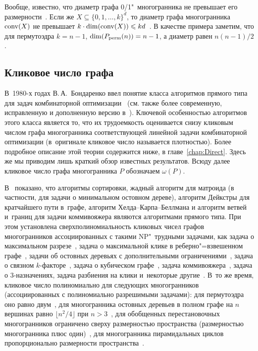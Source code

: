 Вообще, известно, что диаметр графа 0/1"~многогранника не превышает его размерности~\cite{Naddef:1989}.
Если же $X \subseteq \{0,1,\dots,k\}^d$, то диаметр графа многогранника $\operatorname{conv}(X)$ не превышает $k\cdot \dim(\operatorname{conv}(X)) \leqslant k d$~\cite{KleinschmidtOnn:1992}.
В качестве примера заметим, что для пермутоэдра $k=n-1$, $\dim(P_{\textup{perm}}(n)) = n-1$, а диаметр равен $n(n-1)/2$.


\subsection{Кликовое число графа}
\label{sec:CliqueNumber}

В~1980-х годах В.\,А.~Бондаренко ввел понятие класса алгоритмов прямого типа для задач комбинаторной оптимизации~\cite{BondBook:1995} (см. также более современную, исправленную и дополненную версию в~\cite{BondBook:2008}). 
Ключевой особенностью алгоритмов этого класса является то, 
что их трудоемкость оценивается снизу кликовым числом графа многогранника соответствующей линейной задачи комбинаторной оптимизации (в~оригинале %
кликовое число называется плотностью).
Более подробное описание этой теории содержится ниже, в главе~\ref{chap:Direct}.
Здесь же мы приводим лишь краткий обзор известных результатов.
Всюду далее кликовое число графа многогранника $P$ обозначаем $\omega(P)$.

В~\cite{BondBook:1995} показано, что алгоритмы сортировки, 
жадный алгоритм для матроида (в частности, для задачи о минимальном остовном дереве), 
алгоритм Дейкстры для кратчайшего пути в~графе,
алгоритм Хелда--Карпа--Беллмана и алгоритм ветвей и~границ для задачи коммивояжера
являются алгоритмами прямого типа.
При этом установлена сверхполиномиальность кликовых чисел графов многогранников ассоциированных с такими NP"~трудными задачами, как задача
о максимальном разрезе~\cite{Beloshevskii:1986,Barahona:1986},
задача о максимальной клике в реберно"=взвешенном графе~\cite{Greshnev:1984,Bondarenko:1985}, 
задачи об остовных деревьях с дополнительными ограничениями~\cite{Shovgenov:2015}, 
задача о связном $k$-факторе~\cite{Simanchev:2018},
задача о кубическом графе~\cite{Bondarenko:1996},
задача коммивояжера~\cite{Bondarenko:1983}, 
задача о 3-назначениях,
задача разбиения на клики
и~некоторые другие~\cite{BondBook:1995}. %
В~то же время, кликовое число полиномиально для следующих многогранников (ассоциированных с полиномиально разрешимыми задачами): 
для пермутоэдра оно равно двум~\cite{Gaiha:1977}, для многогранника остовных деревьев в полном графе на $n$ вершинах равно $\lfloor n^2/4\rfloor$ при $n > 3$~\cite{Belov:1985}, для обобщенных перестановочных многогранников ограничено сверху размерностью пространства (размерностью многогранника плюс один)~\cite{BondBook:1995},
для многогранника пирамидальных циклов пропорционально размерности пространства~\cite{Nikolaev:2017}.

